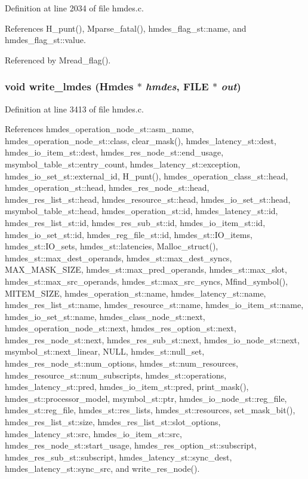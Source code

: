 Definition at line 2034 of file hmdes.c.

References H\_\-punt(), Mparse\_\-fatal(), hmdes\_\-flag\_\-st::name, and hmdes\_\-flag\_\-st::value.

Referenced by Mread\_\-flag().
\subsubsection{\setlength{\rightskip}{0pt plus 5cm}void write\_\-lmdes (\bf{Hmdes} $\ast$ {\em hmdes}, FILE $\ast$ {\em out})}\label{hmdes_8h_c02228103228aa8bc10596f96ca952bb}




Definition at line 3413 of file hmdes.c.

References hmdes\_\-operation\_\-node\_\-st::asm\_\-name, hmdes\_\-operation\_\-node\_\-st::class, clear\_\-mask(), hmdes\_\-latency\_\-st::dest, hmdes\_\-io\_\-item\_\-st::dest, hmdes\_\-res\_\-node\_\-st::end\_\-usage, msymbol\_\-table\_\-st::entry\_\-count, hmdes\_\-latency\_\-st::exception, hmdes\_\-io\_\-set\_\-st::external\_\-id, H\_\-punt(), hmdes\_\-operation\_\-class\_\-st::head, hmdes\_\-operation\_\-st::head, hmdes\_\-res\_\-node\_\-st::head, hmdes\_\-res\_\-list\_\-st::head, hmdes\_\-resource\_\-st::head, hmdes\_\-io\_\-set\_\-st::head, msymbol\_\-table\_\-st::head, hmdes\_\-operation\_\-st::id, hmdes\_\-latency\_\-st::id, hmdes\_\-res\_\-list\_\-st::id, hmdes\_\-res\_\-sub\_\-st::id, hmdes\_\-io\_\-item\_\-st::id, hmdes\_\-io\_\-set\_\-st::id, hmdes\_\-reg\_\-file\_\-st::id, hmdes\_\-st::IO\_\-items, hmdes\_\-st::IO\_\-sets, hmdes\_\-st::latencies, Malloc\_\-struct(), hmdes\_\-st::max\_\-dest\_\-operands, hmdes\_\-st::max\_\-dest\_\-syncs, MAX\_\-MASK\_\-SIZE, hmdes\_\-st::max\_\-pred\_\-operands, hmdes\_\-st::max\_\-slot, hmdes\_\-st::max\_\-src\_\-operands, hmdes\_\-st::max\_\-src\_\-syncs, Mfind\_\-symbol(), MITEM\_\-SIZE, hmdes\_\-operation\_\-st::name, hmdes\_\-latency\_\-st::name, hmdes\_\-res\_\-list\_\-st::name, hmdes\_\-resource\_\-st::name, hmdes\_\-io\_\-item\_\-st::name, hmdes\_\-io\_\-set\_\-st::name, hmdes\_\-class\_\-node\_\-st::next, hmdes\_\-operation\_\-node\_\-st::next, hmdes\_\-res\_\-option\_\-st::next, hmdes\_\-res\_\-node\_\-st::next, hmdes\_\-res\_\-sub\_\-st::next, hmdes\_\-io\_\-node\_\-st::next, msymbol\_\-st::next\_\-linear, NULL, hmdes\_\-st::null\_\-set, hmdes\_\-res\_\-node\_\-st::num\_\-options, hmdes\_\-st::num\_\-resources, hmdes\_\-resource\_\-st::num\_\-subscripts, hmdes\_\-st::operations, hmdes\_\-latency\_\-st::pred, hmdes\_\-io\_\-item\_\-st::pred, print\_\-mask(), hmdes\_\-st::processor\_\-model, msymbol\_\-st::ptr, hmdes\_\-io\_\-node\_\-st::reg\_\-file, hmdes\_\-st::reg\_\-file, hmdes\_\-st::res\_\-lists, hmdes\_\-st::resources, set\_\-mask\_\-bit(), hmdes\_\-res\_\-list\_\-st::size, hmdes\_\-res\_\-list\_\-st::slot\_\-options, hmdes\_\-latency\_\-st::src, hmdes\_\-io\_\-item\_\-st::src, hmdes\_\-res\_\-node\_\-st::start\_\-usage, hmdes\_\-res\_\-option\_\-st::subscript, hmdes\_\-res\_\-sub\_\-st::subscript, hmdes\_\-latency\_\-st::sync\_\-dest, hmdes\_\-latency\_\-st::sync\_\-src, and write\_\-res\_\-node().
